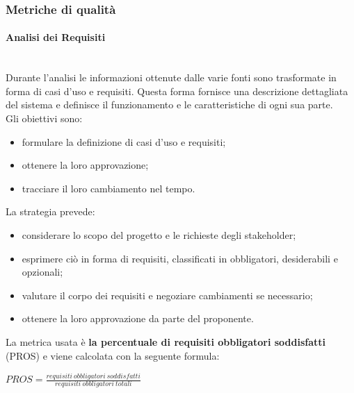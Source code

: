
\subsubsection{Metriche di qualità}
\paragraph{Analisi dei Requisiti} \mbox{}\\

\noindent Durante l’analisi le informazioni ottenute dalle varie fonti sono trasformate in forma di casi d’uso e requisiti. Questa forma fornisce una descrizione dettagliata del sistema e definisce il funzionamento e le caratteristiche di ogni sua parte. \\
Gli obiettivi sono:
\begin{itemize}
	\item formulare la definizione di casi d’uso e requisiti;
	\item ottenere la loro approvazione;
	\item tracciare il loro cambiamento nel tempo.
\end{itemize}
La strategia prevede: 
\begin{itemize}
	\item considerare lo scopo del progetto e le richieste degli stakeholder;
	\item esprimere ciò in forma di requisiti, classificati in obbligatori, desiderabili e opzionali;
	\item valutare il corpo dei requisiti e negoziare cambiamenti se necessario;
	\item ottenere la loro approvazione da parte del proponente.
\end{itemize}
La metrica usata è \textbf{la percentuale di requisiti obbligatori soddisfatti} (PROS) e viene calcolata con la seguente formula:

\begin{center}  $ PROS = \frac{requisiti\ obbligatori\ soddisfatti}{requisiti\ obbligatori\ totali}$
\end{center}

